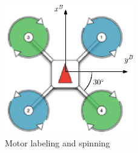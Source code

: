 \begin{figure}[h]
\centering
 \includegraphics[width=0.5\textwidth]{top_iris.eps}
 \caption[Motor rotations]{Motor labeling and spinning}
 \label{figure:motorspin}
\end{figure}

